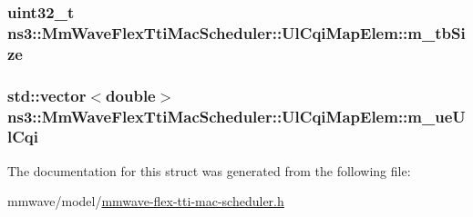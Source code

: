 \subsubsection[{\texorpdfstring{m\+\_\+tb\+Size}{m_tbSize}}]{\setlength{\rightskip}{0pt plus 5cm}uint32\+\_\+t ns3\+::\+Mm\+Wave\+Flex\+Tti\+Mac\+Scheduler\+::\+Ul\+Cqi\+Map\+Elem\+::m\+\_\+tb\+Size}\hypertarget{structns3_1_1MmWaveFlexTtiMacScheduler_1_1UlCqiMapElem_aeeb0d1a9f28aa86a4a2dad990b28c239}{}\label{structns3_1_1MmWaveFlexTtiMacScheduler_1_1UlCqiMapElem_aeeb0d1a9f28aa86a4a2dad990b28c239}
\subsubsection[{\texorpdfstring{m\+\_\+ue\+Ul\+Cqi}{m_ueUlCqi}}]{\setlength{\rightskip}{0pt plus 5cm}std\+::vector$<$double$>$ ns3\+::\+Mm\+Wave\+Flex\+Tti\+Mac\+Scheduler\+::\+Ul\+Cqi\+Map\+Elem\+::m\+\_\+ue\+Ul\+Cqi}\hypertarget{structns3_1_1MmWaveFlexTtiMacScheduler_1_1UlCqiMapElem_a6d9c9c342d782b6926f1fe70b9e73337}{}\label{structns3_1_1MmWaveFlexTtiMacScheduler_1_1UlCqiMapElem_a6d9c9c342d782b6926f1fe70b9e73337}


The documentation for this struct was generated from the following file\+:\begin{DoxyCompactItemize}
\item 
mmwave/model/\hyperlink{mmwave-flex-tti-mac-scheduler_8h}{mmwave-\/flex-\/tti-\/mac-\/scheduler.\+h}\end{DoxyCompactItemize}
